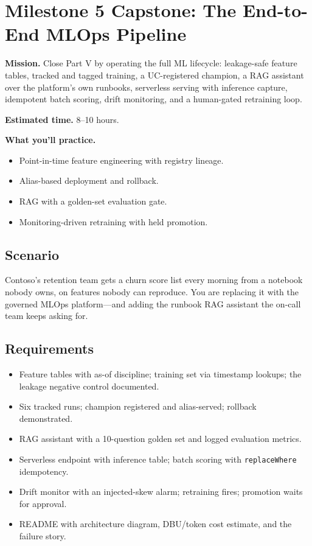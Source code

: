 \section{Milestone 5 Capstone: The End-to-End MLOps Pipeline}\label{sec:ch20-capstone}

\begin{capstonebox}
\textbf{Mission.} Close Part V by operating the full ML lifecycle: leakage-safe feature tables, tracked and tagged training, a UC-registered champion, a RAG assistant over the platform's own runbooks, serverless serving with inference capture, idempotent batch scoring, drift monitoring, and a human-gated retraining loop.

\textbf{Estimated time.} 8--10 hours.

\textbf{What you'll practice.}
\begin{itemize}
    \item Point-in-time feature engineering with registry lineage.
    \item Alias-based deployment and rollback.
    \item RAG with a golden-set evaluation gate.
    \item Monitoring-driven retraining with held promotion.
\end{itemize}
\end{capstonebox}

\subsection*{Scenario}
Contoso's retention team gets a churn score list every morning from a notebook nobody owns, on features nobody can reproduce. You are replacing it with the governed MLOps platform---and adding the runbook RAG assistant the on-call team keeps asking for.

\subsection*{Requirements}
\begin{itemize}
    \item Feature tables with as-of discipline; training set via timestamp lookups; the leakage negative control documented.
    \item Six tracked runs; champion registered and alias-served; rollback demonstrated.
    \item RAG assistant with a 10-question golden set and logged evaluation metrics.
    \item Serverless endpoint with inference table; batch scoring with \texttt{replaceWhere} idempotency.
    \item Drift monitor with an injected-skew alarm; retraining fires; promotion waits for approval.
    \item README with architecture diagram, DBU/token cost estimate, and the failure story.
\end{itemize}

